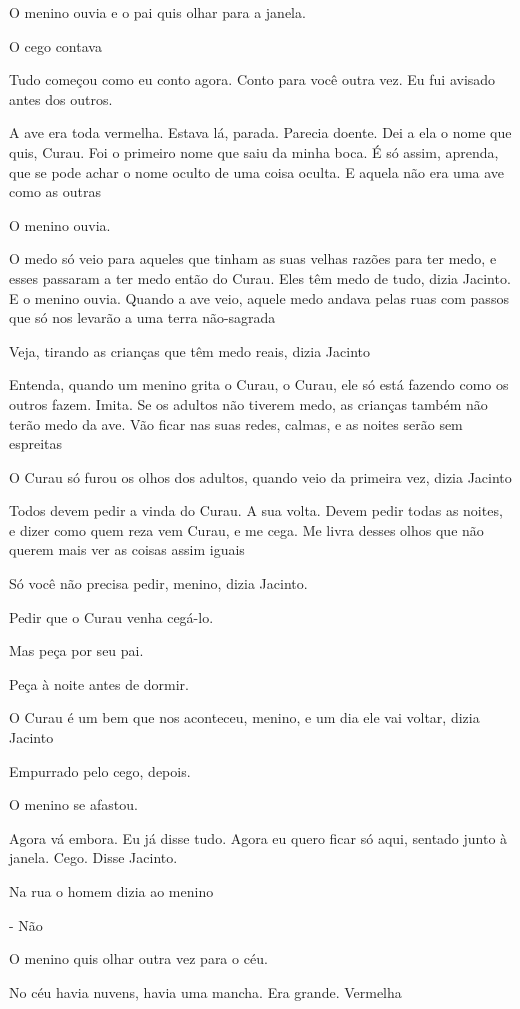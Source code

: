 O menino ouvia e o pai quis olhar para a janela.

O cego contava

Tudo começou como eu conto agora. Conto para você outra vez. Eu fui
avisado antes dos outros.

A ave era toda vermelha. Estava lá, parada. Parecia doente. Dei a ela o
nome que quis, Curau. Foi o primeiro nome que saiu da minha boca. É só
assim, aprenda, que se pode achar o nome oculto de uma coisa oculta. E
aquela não era uma ave como as outras

O menino ouvia.

O medo só veio para aqueles que tinham as suas velhas razões para ter
medo, e esses passaram a ter medo então do Curau. Eles têm medo de tudo,
dizia Jacinto. E o menino ouvia. Quando a ave veio, aquele medo andava
pelas ruas com passos que só nos levarão a uma terra não-sagrada

Veja, tirando as crianças que têm medo reais, dizia Jacinto

Entenda, quando um menino grita o Curau, o Curau, ele só está fazendo
como os outros fazem. Imita. Se os adultos não tiverem medo, as crianças
também não terão medo da ave. Vão ficar nas suas redes, calmas, e as
noites serão sem espreitas

O Curau só furou os olhos dos adultos, quando veio da primeira vez,
dizia Jacinto

Todos devem pedir a vinda do Curau. A sua volta. Devem pedir todas as
noites, e dizer como quem reza vem Curau, e me cega. Me livra desses
olhos que não querem mais ver as coisas assim iguais

Só você não precisa pedir, menino, dizia Jacinto.

Pedir que o Curau venha cegá-lo.

Mas peça por seu pai.

Peça à noite antes de dormir.

O Curau é um bem que nos aconteceu, menino, e um dia ele vai voltar,
dizia Jacinto

Empurrado pelo cego, depois.

O menino se afastou.

Agora vá embora. Eu já disse tudo. Agora eu quero ficar só aqui, sentado
junto à janela. Cego. Disse Jacinto.

Na rua o homem dizia ao menino

- Não

O menino quis olhar outra vez para o céu.

No céu havia nuvens, havia uma mancha. Era grande. Vermelha

